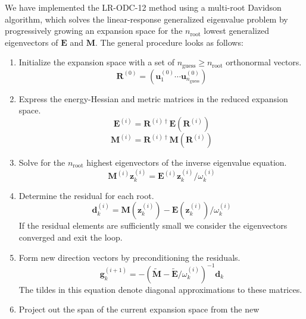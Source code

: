 We have implemented the LR-ODC-12 method using a multi-root Davidson algorithm,
which solves the linear-response generalized eigenvalue problem by progressively
growing an expansion space for the \(n_\mathrm{root}\) lowest generalized
eigenvectors of \(\mathbf{E}\) and \(\mathbf{M}\).
The general procedure looks as follows:
\begin{enumerate}
    \item
        \label{item:davidson-initialization}
        Initialize the expansion space with a set of \(n_\mathrm{guess}\geq
        n_\mathrm{root}\) orthonormal vectors.
        \[
            \mathbf{R}^{(0)}
            =
            (
                \mathbf{u}_1^{(0)}
                \cdots
                \mathbf{u}_{n_\mathrm{guess}}^{(0)}
            )
        \]
    \item
        \label{item:davidson-step-one}
        Express the energy-Hessian and metric matrices in the reduced expansion
        space.
        \[
            \mathbf{E}^{(i)}
            =
            \mathbf{R}^{(i)\dagger}
            \mathbf{E}(\mathbf{R}^{(i)})
        \]
        \[
            \mathbf{M}^{(i)}
            =
            \mathbf{R}^{(i)\dagger}
            \mathbf{M}(\mathbf{R}^{(i)})
        \]
    \item
        Solve for the \(n_\mathrm{root}\) highest eigenvectors of the
        inverse eigenvalue equation.
        \[
            \mathbf{M}^{(i)}
            \mathbf{z}_k^{(i)}
            =
            \mathbf{E}^{(i)}
            \mathbf{z}_k^{(i)}/
            \omega_k^{(i)}
        \]
    \item
        Determine the residual for each root.
        \[
            \mathbf{d}_k^{(i)}
            =
            \mathbf{M}(\mathbf{z}_k^{(i)})
            -
            \mathbf{E}(\mathbf{z}_k^{(i)})/
            \omega_k^{(i)}
        \]
        If the residual elements are sufficiently small we consider the
        eigenvectors converged and exit the loop.
    \item
        \label{item:davidson-step-three}
        Form new direction vectors by preconditioning the residuals.
        \[
            \mathbf{g}_k^{(i+1)}
            =
            -
            (
                \tilde{\mathbf{M}}
                -
                \tilde{\mathbf{E}}/
                \omega_k^{(i)}
            )^{-1}
            \mathbf{d}_k
        \]
        The tildes in this equation denote diagonal approximations to these
        matrices.
    \item
        Project out the span of the current expansion space from the new

\end{enumerate}
